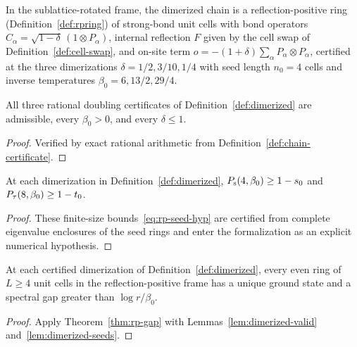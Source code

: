 \begin{definition}
  \label{def:dimerized}
  \leanok
  In the sublattice-rotated frame, the dimerized chain is a reflection-positive ring
  (Definition~\ref{def:rpring}) of strong-bond unit cells with bond operators
  \(C_\alpha = \sqrt{1-\delta}\,(1 \otimes P_\alpha)\), internal reflection \(F\) given by the cell
  swap of Definition~\ref{def:cell-swap}, and on-site term
  \(o = -(1+\delta) \sum_\alpha P_\alpha \otimes P_\alpha\), certified at the three dimerizations
  \(\delta = 1/2, 3/10, 1/4\) with seed length \(n_0 = 4\) cells and inverse temperatures
  \(\beta_0 = 6, 13/2, 29/4\).
\end{definition}

\begin{lemma}
  \label{lem:dimerized-valid}
  \leanok
  All three rational doubling certificates of Definition~\ref{def:dimerized} are admissible, every
  \(\beta_0 > 0\), and every \(\delta \le 1\).
\end{lemma}
\begin{proof}
  \leanok
  Verified by exact rational arithmetic from Definition~\ref{def:chain-certificate}.
\end{proof}

\begin{lemma}
  \label{lem:dimerized-seeds}
  \leanok
  At each dimerization in Definition~\ref{def:dimerized}, \(P_{\mathrm{s}}(4, \beta_0) \ge 1 - s_0\) and
  \(P_{\tau}(8, \beta_0) \ge 1 - t_0\).
\end{lemma}
\begin{proof}
  These finite-size bounds~\eqref{eq:rp-seed-hyp} are certified from complete eigenvalue enclosures
  of the seed rings and enter the formalization as an explicit numerical hypothesis.
\end{proof}

\begin{theorem}
  \label{thm:dimerized-gap}
  \leanok
  At each certified dimerization of Definition~\ref{def:dimerized}, every even ring of \(L \ge 4\)
  unit cells in the reflection-positive frame has a unique ground state and a spectral gap greater
  than \(\log r / \beta_0\).
\end{theorem}
\begin{proof}
  \leanok
  Apply Theorem~\ref{thm:rp-gap} with Lemmas~\ref{lem:dimerized-valid} and~\ref{lem:dimerized-seeds}.
\end{proof}

